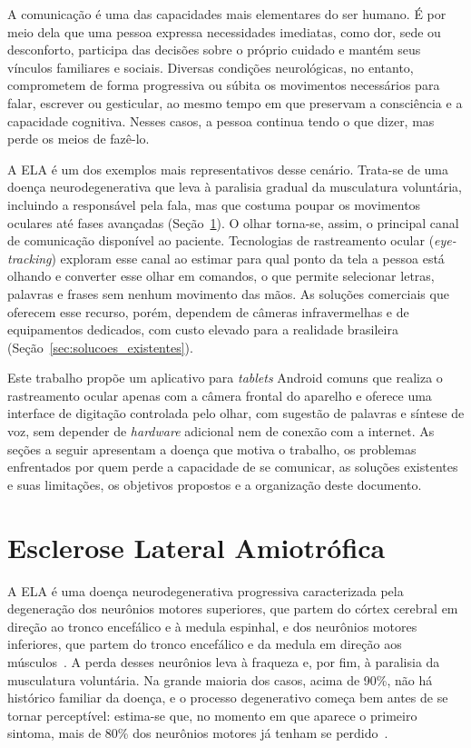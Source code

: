 A comunicação é uma das capacidades mais elementares do ser humano. É por meio dela que uma pessoa expressa necessidades imediatas, como dor, sede ou desconforto, participa das decisões sobre o próprio cuidado e mantém seus vínculos familiares e sociais. Diversas condições neurológicas, no entanto, comprometem de forma progressiva ou súbita os movimentos necessários para falar, escrever ou gesticular, ao mesmo tempo em que preservam a consciência e a capacidade cognitiva. Nesses casos, a pessoa continua tendo o que dizer, mas perde os meios de fazê-lo.

A \gls{ELA} é um dos exemplos mais representativos desse cenário. Trata-se de uma doença neurodegenerativa que leva à paralisia gradual da musculatura voluntária, incluindo a responsável pela fala, mas que costuma poupar os movimentos oculares até fases avançadas (Seção~\ref{sec:ela}). O olhar torna-se, assim, o principal canal de comunicação disponível ao paciente. Tecnologias de rastreamento ocular (\textit{eye-tracking}) exploram esse canal ao estimar para qual ponto da tela a pessoa está olhando e converter esse olhar em comandos, o que permite selecionar letras, palavras e frases sem nenhum movimento das mãos. As soluções comerciais que oferecem esse recurso, porém, dependem de câmeras infravermelhas e de equipamentos dedicados, com custo elevado para a realidade brasileira (Seção~\ref{sec:solucoes_existentes}).

Este trabalho propõe um aplicativo para \textit{tablets} Android comuns que realiza o rastreamento ocular apenas com a câmera frontal do aparelho e oferece uma interface de digitação controlada pelo olhar, com sugestão de palavras e síntese de voz, sem depender de \textit{hardware} adicional nem de conexão com a internet. As seções a seguir apresentam a doença que motiva o trabalho, os problemas enfrentados por quem perde a capacidade de se comunicar, as soluções existentes e suas limitações, os objetivos propostos e a organização deste documento.

\section{Esclerose Lateral Amiotrófica} \label{sec:ela}

A \gls{ELA} é uma doença neurodegenerativa progressiva caracterizada pela degeneração dos neurônios motores superiores, que partem do córtex cerebral em direção ao tronco encefálico e à medula espinhal, e dos neurônios motores inferiores, que partem do tronco encefálico e da medula em direção aos músculos~\cite{hardiman2017als}. A perda desses neurônios leva à fraqueza e, por fim, à paralisia da musculatura voluntária. Na grande maioria dos casos, acima de 90\%, não há histórico familiar da doença, e o processo degenerativo começa bem antes de se tornar perceptível: estima-se que, no momento em que aparece o primeiro sintoma, mais de 80\% dos neurônios motores já tenham se perdido~\cite{pcdt_ela2020}.

